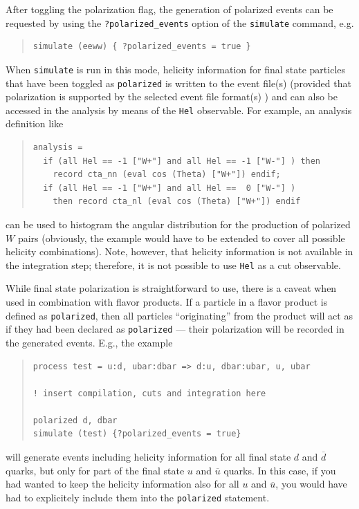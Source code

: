 \documentclass[12pt]{book}
\newcommand{\ttt}[1]{\texttt{#1}}
\begin{document}
After toggling the polarization flag, the generation of polarized events can be
requested by using the \ttt{?polarized\_events} option of the \ttt{simulate}
command, e.g.
\begin{quote}
\begin{footnotesize}
\begin{verbatim}
simulate (eeww) { ?polarized_events = true }
\end{verbatim}
\end{footnotesize}
\end{quote}
When \ttt{simulate} is run in this mode, helicity information for final state
particles that have been toggled as \ttt{polarized} is written to the event
file(s) (provided that polarization is supported by the selected event file
format(s) ) and can also be accessed in the analysis by means of the \ttt{Hel}
observable. For example, an analysis definition like
\begin{quote}
\begin{footnotesize}
\begin{verbatim}
analysis =
  if (all Hel == -1 ["W+"] and all Hel == -1 ["W-"] ) then
    record cta_nn (eval cos (Theta) ["W+"]) endif;
  if (all Hel == -1 ["W+"] and all Hel ==  0 ["W-"] )
    then record cta_nl (eval cos (Theta) ["W+"]) endif
\end{verbatim}
\end{footnotesize}
\end{quote}
can be used to histogram the angular distribution for the production of
polarized $W$ pairs (obviously, the example would have to be extended
to cover all possible helicity combinations). Note, however, that
helicity information is not available in the integration step;
therefore, it is not possible to use \ttt{Hel} as a cut observable.

While final state polarization is straightforward to use, there is a caveat when
used in combination with flavor products. If a particle in a flavor product is
defined as \ttt{polarized}, then all particles ``originating'' from the product will
act as if they had been declared as \ttt{polarized} --- their polarization will
be recorded in the generated events. E.g., the example
\begin{quote}
\begin{footnotesize}
\begin{verbatim}
process test = u:d, ubar:dbar => d:u, dbar:ubar, u, ubar

! insert compilation, cuts and integration here

polarized d, dbar
simulate (test) {?polarized_events = true}
\end{verbatim}
\end{footnotesize}
\end{quote}
will generate events including helicity information for all final state $d$ and
$\overline{d}$ quarks, but only for part of the final state $u$ and $\overline{u}$
quarks. In this case, if you had wanted to keep the helicity information also
for all $u$ and $\overline{u}$, you would have had to explicitely include them
into the \ttt{polarized} statement.
\end{document}
